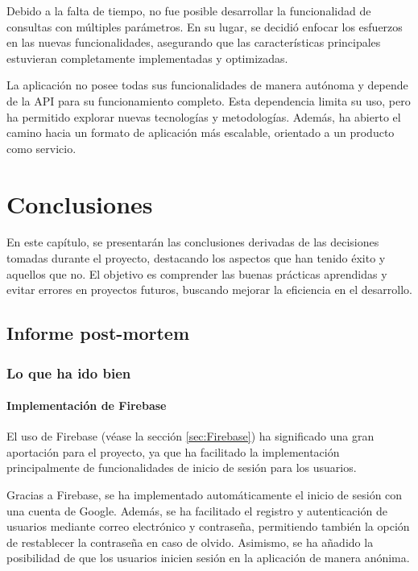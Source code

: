 \documentclass[12pt,twoside,titlepage]{report}
\newcommand\blankpage{%
    \newpage
    \null
    \thispagestyle{empty}%
    \newpage}
\begin{document}
Debido a la falta de tiempo, no fue posible desarrollar la funcionalidad de consultas con múltiples parámetros. En su lugar, se decidió enfocar los esfuerzos en las nuevas funcionalidades, asegurando que las características principales estuvieran completamente implementadas y optimizadas.

La aplicación no posee todas sus funcionalidades de manera autónoma y depende de la API para su funcionamiento completo. Esta dependencia limita su uso, pero ha permitido explorar nuevas tecnologías y metodologías. Además, ha abierto el camino hacia un formato de aplicación más escalable, orientado a un producto como servicio.

\blankpage


\chapter{Conclusiones}

En este capítulo, se presentarán las conclusiones derivadas de las decisiones tomadas durante el proyecto, destacando los aspectos que han tenido éxito y aquellos que no. El objetivo es comprender las buenas prácticas aprendidas y evitar errores en proyectos futuros, buscando mejorar la eficiencia en el desarrollo.

\section{Informe post-mortem}

\subsection{Lo que ha ido bien}

\subsubsection{Implementación de Firebase}

 El uso de Firebase (véase la sección \ref{sec:Firebase}) ha significado una gran aportación para el proyecto, ya que ha facilitado la implementación principalmente de funcionalidades de inicio de sesión para los usuarios.

Gracias a Firebase, se ha implementado automáticamente el inicio de sesión con una cuenta de Google. Además, se ha facilitado el registro y autenticación de usuarios mediante correo electrónico y contraseña, permitiendo también la opción de restablecer la contraseña en caso de olvido. Asimismo, se ha añadido la posibilidad de que los usuarios inicien sesión en la aplicación de manera anónima.
\end{document}
